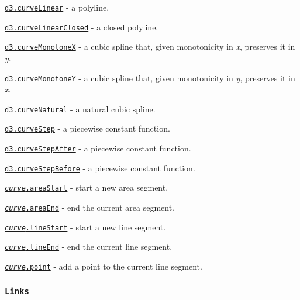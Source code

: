 \begin{DoxyItemize}
\item \href{https://github.com/d3/d3-shape/blob/master/README.md#curveLinear}{\tt d3.\+curve\+Linear} -\/ a polyline.
\item \href{https://github.com/d3/d3-shape/blob/master/README.md#curveLinearClosed}{\tt d3.\+curve\+Linear\+Closed} -\/ a closed polyline.
\item \href{https://github.com/d3/d3-shape/blob/master/README.md#curveMonotoneX}{\tt d3.\+curve\+MonotoneX} -\/ a cubic spline that, given monotonicity in {\itshape x}, preserves it in {\itshape y}.
\item \href{https://github.com/d3/d3-shape/blob/master/README.md#curveMonotoneY}{\tt d3.\+curve\+MonotoneY} -\/ a cubic spline that, given monotonicity in {\itshape y}, preserves it in {\itshape x}.
\item \href{https://github.com/d3/d3-shape/blob/master/README.md#curveNatural}{\tt d3.\+curve\+Natural} -\/ a natural cubic spline.
\item \href{https://github.com/d3/d3-shape/blob/master/README.md#curveStep}{\tt d3.\+curve\+Step} -\/ a piecewise constant function.
\item \href{https://github.com/d3/d3-shape/blob/master/README.md#curveStepAfter}{\tt d3.\+curve\+Step\+After} -\/ a piecewise constant function.
\item \href{https://github.com/d3/d3-shape/blob/master/README.md#curveStepBefore}{\tt d3.\+curve\+Step\+Before} -\/ a piecewise constant function.
\item \href{https://github.com/d3/d3-shape/blob/master/README.md#curve_areaStart}{\tt {\itshape curve}.area\+Start} -\/ start a new area segment.
\item \href{https://github.com/d3/d3-shape/blob/master/README.md#curve_areaEnd}{\tt {\itshape curve}.area\+End} -\/ end the current area segment.
\item \href{https://github.com/d3/d3-shape/blob/master/README.md#curve_lineStart}{\tt {\itshape curve}.line\+Start} -\/ start a new line segment.
\item \href{https://github.com/d3/d3-shape/blob/master/README.md#curve_lineEnd}{\tt {\itshape curve}.line\+End} -\/ end the current line segment.
\item \href{https://github.com/d3/d3-shape/blob/master/README.md#curve_point}{\tt {\itshape curve}.point} -\/ add a point to the current line segment.
\end{DoxyItemize}

\subsubsection*{\href{https://github.com/d3/d3-shape/blob/master/README.md#links}{\tt Links}}

